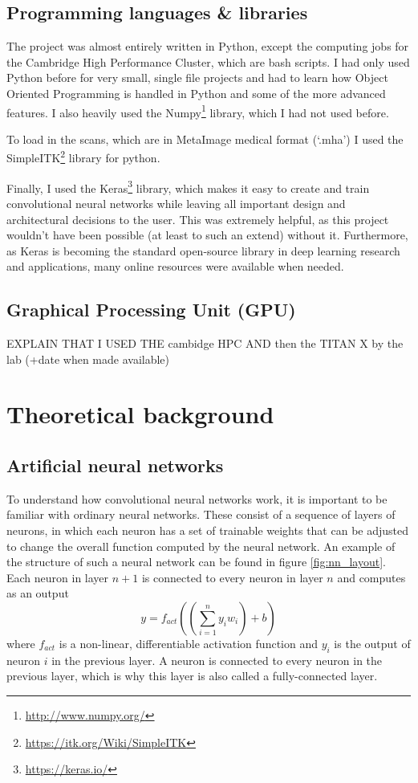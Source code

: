 \documentclass[12pt,a4paper,twoside,openright]{report}
\begin{document}
\subsection{Programming languages \& libraries}
The project was almost entirely written in Python, except the computing jobs for the Cambridge High Performance Cluster, which are bash scripts. I had only used Python before for very small, single file projects and had to learn how Object Oriented Programming is handled in Python and some of the more advanced features. I also heavily used the Numpy\footnote{\url{http://www.numpy.org/}} library, which I had not used before.

To load in the scans, which are in MetaImage medical format (`.mha') I used the SimpleITK\footnote{\url{https://itk.org/Wiki/SimpleITK}} library for python.

Finally, I used the Keras\footnote{\url{https://keras.io/}} library, which makes it easy to create and train convolutional neural networks while leaving all important design and architectural decisions to the user. This was extremely helpful, as this project wouldn't have been possible (at least to such an extend) without it. Furthermore, as Keras is becoming the standard open-source library in deep learning research and applications, many online resources were available when needed.

\subsection{Graphical Processing Unit (GPU)}
EXPLAIN THAT I USED THE cambidge HPC AND then the TITAN X by the lab (+date when made available)

\section{Theoretical background}
\subsection{Artificial neural networks}
To understand how convolutional neural networks work, it is important to be familiar with ordinary neural networks. These consist of a sequence of layers of neurons, in which each neuron has a set of trainable weights that can be adjusted to change the overall function computed by the neural network. An example of the structure of such a neural network can be found in figure \ref{fig:nn_layout}. Each neuron in layer $n+1$ is connected to every neuron in layer $n$ and computes as an output
\[y = f_{act}((\sum_{i=1}^{n} y_i w_i) + b)\]
where $f_{act}$ is a non-linear, differentiable activation function and $y_i$ is the output of neuron $i$ in the previous layer. A neuron is connected to every neuron in the previous layer, which is why this layer is also called a fully-connected layer.
\end{document}
